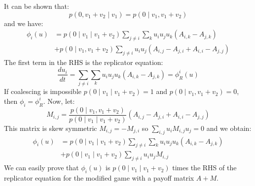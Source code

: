 It can be shown that:
\[
p\left(0,v_{1}+v_{2}\mid v_{1}\right)=p\left(0\mid v_{1},v_{1}+v_{2}\right)
\]
 and we have:
\begin{align*}
\phi_{i}\left(u\right) & =p\left(0\mid v_{1}\mid v_{1}+v_{2}\right)\sum_{j\neq i}\sum_{k}u_{i}u_{j}u_{k}\left(A_{i,k}-A_{j,k}\right)\\
 & +p\left(0\mid v_{1},v_{1}+v_{2}\right)\sum_{j\neq i}u_{i}u_{j}\left(A_{i,j}-A_{j,i}+A_{i,i}-A_{j,j}\right)
\end{align*}
The first term in the RHS is the replicator equation:
\[
\frac{du_{i}}{dt}=\sum_{j\neq i}\sum_{k}u_{i}u_{j}u_{k}\left(A_{i,k}-A_{j,k}\right)=\phi_{R}^{i}\left(u\right)
\]
If coalescing is impossible $p\left(0\mid v_{1}\mid v_{1}+v_{2}\right)=1$
and $p\left(0\mid v_{1},v_{1}+v_{2}\right)=0$, then $\phi_{i}=\phi_{R}^{i}$.
Now, let:
\[
M_{i,j}=\frac{p\left(0\mid v_{1},v_{1}+v_{2}\right)}{p\left(0\mid v_{1}\mid v_{1}+v_{2}\right)}\left(A_{i,j}-A_{j,i}+A_{i,i}-A_{j,j}\right)
\]
This matrix is skew symmetric $M_{i,j}=-M_{j,i}$ so $\sum_{i,j}u_{i}M_{i,j}u_{j}=0$
and we obtain:
\begin{align*}
\phi_{i}\left(u\right) & =p\left(0\mid v_{1}\mid v_{1}+v_{2}\right)\sum_{j\neq i}\sum_{k}u_{i}u_{j}u_{k}\left(A_{i,k}-A_{j,k}\right)\\
 & +p\left(0\mid v_{1}\mid v_{1}+v_{2}\right)\sum_{j\neq i}u_{i}u_{j}M_{i,j}
\end{align*}
We can easily prove that $\phi_{i}\left(u\right)$ is $p\left(0\mid v_{1}\mid v_{1}+v_{2}\right)$
times the RHS of the replicator equation for the modified game with
a payoff matrix $A+M$.

